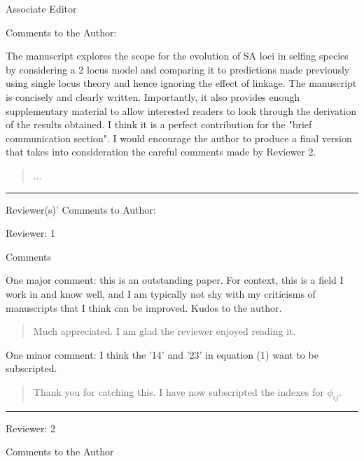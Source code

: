 \documentclass[11pt]{article}
\begin{document}
Associate Editor

\noindent Comments to the Author:
\bigskip 

The manuscript explores the scope for the evolution of SA loci in selfing species by considering a 2 locus model and comparing it to predictions made previously using single locus theory and hence ignoring the effect of linkage. The manuscript is concisely and clearly written. Importantly, it also provides enough supplementary material to allow interested readers to look through the derivation of the results obtained. I think it is a perfect contribution for the "brief communication section". I would encourage the author to produce a final version that takes into consideration the careful comments made by Reviewer 2.

	\begin{quote}
		...
	\end{quote}

\bigskip
\noindent \rule{8cm}{0.4pt}
\bigskip

\noindent Reviewer(s)' Comments to Author:
\bigskip

\noindent Reviewer: 1
\bigskip

\noindent Comments
\bigskip

\noindent One major comment: this is an outstanding paper. For context, this is a field I work in and know well, and I am typically not shy with my criticisms of manuscripts that I think can be improved. Kudos to the author.

	\begin{quote}
		Much appreciated. I am glad the reviewer enjoyed reading it.
	\end{quote}

\noindent One minor comment: I think the '14' and '23' in equation (1) want to be subscripted.

	\begin{quote}
		Thank you for catching this. I have now subscripted the indexes for $\phi_{ij}$.
	\end{quote}



\bigskip
\noindent \rule{8cm}{0.4pt}
\bigskip



\noindent Reviewer: 2
\bigskip

\noindent Comments to the Author
\bigskip
\end{document}
